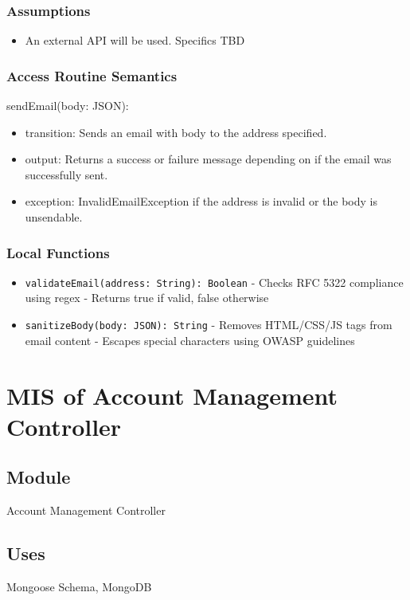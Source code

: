 \documentclass[12pt, titlepage]{article}
\begin{document}
\subsubsection{Assumptions}
\begin{itemize}
  \item An external API will be used. Specifics TBD
\end{itemize}

\subsubsection{Access Routine Semantics}

\noindent sendEmail(body: JSON):
\begin{itemize}
  \item transition: Sends an email with body to the address specified.
  \item output: Returns a success or failure message depending on if the email was successfully sent.
  \item exception: InvalidEmailException if the address is invalid or the body is unsendable.
\end{itemize}

\subsubsection{Local Functions}
\begin{itemize}
  \item \texttt{validateEmail(address: String): Boolean}  
    - Checks RFC 5322 compliance using regex  
    - Returns true if valid, false otherwise
    
  \item \texttt{sanitizeBody(body: JSON): String}  
    - Removes HTML/CSS/JS tags from email content  
    - Escapes special characters using OWASP guidelines
\end{itemize}

\section{MIS of Account Management Controller} \label{AccountManagementController}

\subsection{Module}
Account Management Controller

\subsection{Uses}
Mongoose Schema, MongoDB
\end{document}

